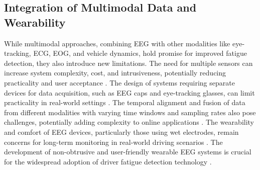 \subsection{Integration of Multimodal Data and Wearability}
While multimodal approaches, combining EEG with other modalities like eye-tracking, ECG, EOG, and vehicle dynamics, hold promise for improved fatigue detection, they also introduce new limitations.  The need for multiple sensors can increase system complexity, cost, and intrusiveness, potentially reducing practicality and user acceptance \citep{Lian_Z_2024, Martensson_H_2019, Monteiro_T_2019, Yin_J_2017, Chan_K_2021, Flumeri_G_2022, Martensson_H_2019}.  The design of systems requiring separate devices for data acquisition, such as EEG caps and eye-tracking glasses, can limit practicality in real-world settings \citep{Lian_Z_2024}.  The temporal alignment and fusion of data from different modalities with varying time windows and sampling rates also pose challenges, potentially adding complexity to online applications \citep{Lian_Z_2024, Tang_J_2021}.  The wearability and comfort of EEG devices, particularly those using wet electrodes, remain concerns for long-term monitoring in real-world driving scenarios \citep{Kartsch_V_2018, Martensson_H_2019, Nguyen_H_2023_1, Shalash_W_2019, Sheykhivand_S_2022_1, Yin_J_2017}.  The development of non-obtrusive and user-friendly wearable EEG systems is crucial for the widespread adoption of driver fatigue detection technology \citep{Chan_K_2021, Shalash_W_2019, Wei_C_2018}.

